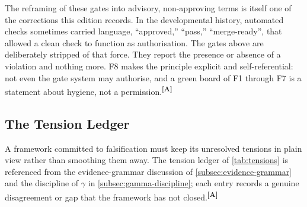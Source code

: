 \documentclass[12pt,a4paper,twoside]{article}
\theoremstyle{plain}
\theoremstyle{definition}
\theoremstyle{remark}
\newcommand{\catmark}[1]{\textsuperscript{\textsf{\textbf{[#1]}}}}
\begin{document}
\noindent The reframing of these gates into advisory, non-approving terms is itself one of the corrections this edition records. In the developmental history, automated checks sometimes carried language, ``approved,'' ``pass,'' ``merge-ready'', that allowed a clean check to function as authorisation. The gates above are deliberately stripped of that force. They report the presence or absence of a violation and nothing more. F8 makes the principle explicit and self-referential: not even the gate system may authorise, and a green board of F1 through F7 is a statement about hygiene, not a permission.\catmark{A}

\subsection{The Tension Ledger}
\label{sec:tension-ledger}

A framework committed to falsification must keep its unresolved tensions in plain view rather than smoothing them away. The tension ledger of \cref{tab:tensions} is referenced from the evidence-grammar discussion of \cref{subsec:evidence-grammar} and the discipline of $\gamma$ in \cref{subsec:gamma-discipline}; each entry records a genuine disagreement or gap that the framework has not closed.\catmark{A}
\end{document}
